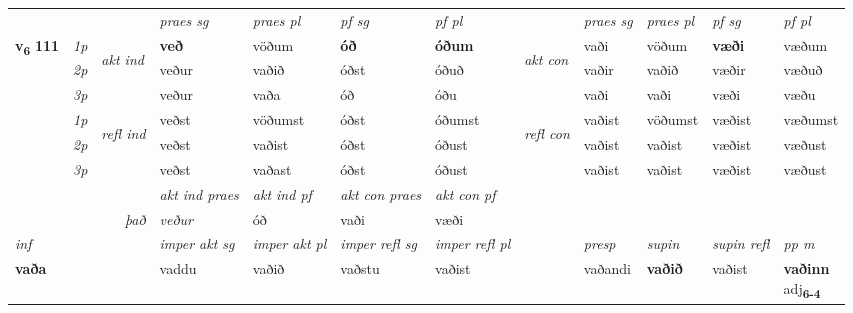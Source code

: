 \begin{longtable}[l]{X>{\footnotesize\itshape}llXXXXlXXXX}
\midrule

 & &   & \textit{praes sg}  & \textit{praes pl}    & \textit{ pf sg} & \textit{pf pl} & & \textit{praes sg}  & \textit{praes pl}    & \textit{pf sg} & \textit{pf pl }  \\ \cmidrule{4-7} \cmidrule{9-12}
 \multirow{2}{*}{{{\textbf{v{\textsubscript{6}}} \Large{\textbf{111}}}}}  & 1p & \multirow{3}{*}{\begin{turn}{90}\textit{akt ind}\end{turn}} & \textbf{veð} & vöðum & \textbf{óð} & \textbf{óðum} & \multirow{3}{*}{\begin{turn}{90}\textit{akt con}\end{turn}} &vaði & vöðum & \textbf{væði} & væðum\\*
 & 2p &  &  veður  & vaðið & óðst & óðuð & & vaðir & vaðið & væðir & væðuð \\*
 & 3p &  & veður & vaða & óð & óðu & & vaði & vaði& væði & væðu \\*
\cmidrule{4-7} \cmidrule{9-12}
 & 1p & \multirow{3}{*}{\begin{turn}{90}\textit{refl ind}\end{turn}}  & veðst & vöðumst & óðst & óðumst & \multirow{3}{*}{\begin{turn}{90}\textit{refl con}\end{turn}}  &vaðist & vöðumst & væðist & væðumst \\*
 & 2p &  & veðst & vaðist & óðst & óðust & &vaðist & vaðist & væðist & væðust \\*
 & 3p  & & veðst & vaðast & óðst & óðust & & vaðist & vaðist& væðist & væðust \\*
\cmidrule{4-7} \cmidrule{9-12}

   && &  \textit{akt ind praes} & \textit{akt ind pf} & \textit{akt con praes} & \textit{akt con pf} \\*
\multicolumn{3}{r}{\textit{það}} & veður & óð & vaði & væði \\*

\cmidrule{4-7}
   {\textit{inf}} & &  & \textit{imper akt sg} & \textit{imper akt pl} & \textit{imper refl sg} & \textit{imper refl pl} && \textit{presp} & \textit{supin} & \textit{supin refl} & \textit{pp m} \\*
  {\textbf{vaða}} & && vaddu  & vaðið & vaðstu & vaðist && vaðandi &  \textbf{vaðið} & vaðist & \specialcell{\textbf{vaðinn} \\ adj\textbf{\textsubscript{6-4}}} \\*


\end{longtable}
